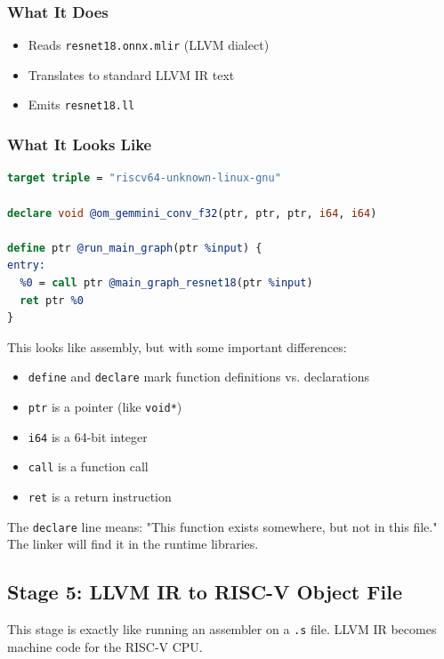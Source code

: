 \documentclass[12pt,a4paper]{article}
\begin{document}
\subsubsection{What It Does}
\begin{itemize}
  \item Reads \texttt{resnet18.onnx.mlir} (LLVM dialect)
  \item Translates to standard LLVM IR text
  \item Emits \texttt{resnet18.ll}
\end{itemize}

\subsubsection{What It Looks Like}
\begin{lstlisting}[language=LLVM, caption=Stage 4 LLVM IR Output]
target triple = "riscv64-unknown-linux-gnu"

declare void @om_gemmini_conv_f32(ptr, ptr, ptr, i64, i64)

define ptr @run_main_graph(ptr %input) {
entry:
  %0 = call ptr @main_graph_resnet18(ptr %input)
  ret ptr %0
}
\end{lstlisting}

\begin{analogyenv}
This looks like assembly, but with some important differences:
\begin{itemize}
  \item \texttt{define} and \texttt{declare} mark function definitions vs. declarations
  \item \texttt{ptr} is a pointer (like \texttt{void*})
  \item \texttt{i64} is a 64-bit integer
  \item \texttt{call} is a function call
  \item \texttt{ret} is a return instruction
\end{itemize}

The \texttt{declare} line means: "This function exists somewhere, but not in this file." The linker will find it in the runtime libraries.
\end{analogyenv}

\subsection{Stage 5: LLVM IR to RISC-V Object File}

\begin{analogyenv}
This stage is exactly like running an assembler on a \texttt{.s} file. LLVM IR becomes machine code for the RISC-V CPU.
\end{analogyenv}
\end{document}
